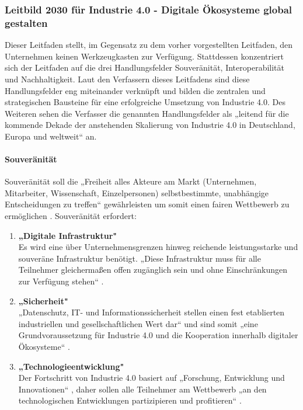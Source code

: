 \subsubsection{Leitbild 2030 für Industrie 4.0 - Digitale Ökosysteme global gestalten}\label{sec:PlattformIndustrieLeitfaden}
Dieser Leitfaden stellt, im Gegensatz zu dem vorher vorgestellten Leitfaden, den Unternehmen keinen Werkzeugkasten zur Verfügung. Stattdessen konzentriert sich der Leitfaden auf die drei Handlungsfelder Souveränität, Interoperabilität und Nachhaltigkeit. Laut den Verfassern dieses Leitfadens sind diese Handlungsfelder eng miteinander verknüpft und bilden die zentralen und strategischen Bausteine für eine erfolgreiche Umsetzung von Industrie 4.0. Des Weiteren sehen die Verfasser die genannten Handlungsfelder als „leitend für die kommende Dekade der anstehenden Skalierung von Industrie 4.0 in Deutschland, Europa und weltweit“ \cite[S.3]{3} an.

\paragraph{Souveränität}\label{sec:Souveränität}
\noindent Souveränität soll die „Freiheit alles Akteure am Markt (Unternehmen, Mitarbeiter, Wissenschaft, Einzelpersonen) selbstbestimmte, unabhängige Entscheidungen zu treffen“ \cite[S.4]{3} gewährleisten um somit einen fairen Wettbewerb zu ermöglichen \cite[S.4]{3}. Souveränität erfordert:
\begin{enumerate}
	\item \textbf{„Digitale Infrastruktur"} \cite[S.4]{3} \\
	Es wird eine über Unternehmensgrenzen hinweg reichende leistungsstarke und souveräne
	Infrastruktur benötigt. „Diese Infrastruktur muss für alle Teilnehmer gleichermaßen offen 
	zugänglich sein und ohne Einschränkungen zur Verfügung stehen“ \cite[S.4]{3}.
	\item \textbf{„Sicherheit"} \cite[S.4]{3} \\
	„Datenschutz, IT- und Informationssicherheit stellen einen fest etablierten industriellen
	und gesellschaftlichen Wert dar“ \cite[S.4]{3} und sind somit „eine Grundvoraussetzung
	für Industrie 4.0 und die Kooperation innerhalb digitaler Ökosysteme“ \cite[S.4]{3}.
	\item \textbf{„Technologieentwicklung"} \cite[S.4]{3} \\
	Der Fortschritt von Industrie 4.0 basiert auf „Forschung, Entwicklung und Innovationen“ 
	\cite[S.4]{3}, daher sollen alle Teilnehmer am Wettbewerb „an den technologischen 
	Entwicklungen partizipieren und profitieren“ \cite[S.4]{3}.
\end{enumerate}


